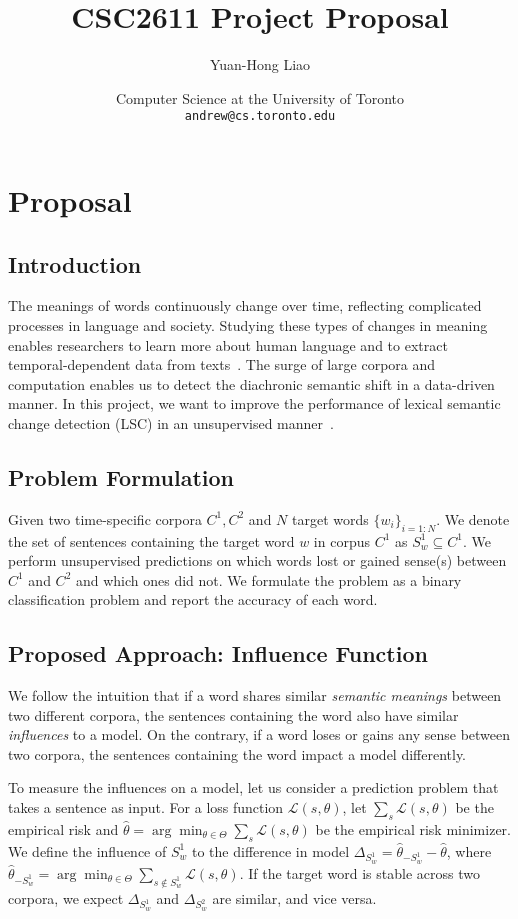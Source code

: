 \documentclass[a4paper]{article}
\title{CSC2611 Project Proposal}
\author{Yuan-Hong Liao}
\date{
	Computer Science at the University of Toronto \\ \texttt{andrew@cs.toronto.edu}
}
\theoremstyle{plain}
\theoremstyle{definition}
\begin{document}
\maketitle

\section{Proposal}

\subsection{Introduction}

The meanings of words continuously change over time, reflecting complicated processes in language and society. 
Studying these types of changes in meaning enables researchers to learn more about human language and to extract temporal-dependent data from texts~\cite{kutuzov-etal-2018-diachronic}.
The surge of large corpora and computation enables us to detect the diachronic semantic shift in a data-driven manner.
In this project, we want to improve the performance of lexical semantic change detection (LSC) in an unsupervised manner~\cite{schlechtweg-etal-2020-semeval}.


\subsection{Problem Formulation}
Given two time-specific corpora $C^1, C^2$ and $N$ target words $\{w_i\}_{i=1:N}$.
We denote the set of sentences containing the target word $w$ in corpus $C^1$ as $S_w^1 \subseteq C^1$.
We perform unsupervised predictions on which words lost or gained sense(s) between $C^1$ and $C^2$ and which ones did not.
We formulate the problem as a binary classification problem and report the accuracy of each word.


\subsection{Proposed Approach: Influence Function}

We follow the intuition that if a word shares similar \textit{semantic meanings} between two different corpora, the sentences containing the word also have similar \textit{influences} to a model.
On the contrary, if a word loses or gains any sense between two corpora, the sentences containing the word impact a model differently.

To measure the influences on a model, let us consider a prediction problem that takes a sentence as input.
For a loss function $\mathcal{L}(s, \theta)$, let $\sum_{s} \mathcal{L}(s, \theta)$ be the empirical risk and $\hat{\theta} = \arg\min_{\theta \in \Theta} \sum_{s} \mathcal{L}(s, \theta)$ be the empirical risk minimizer.
We define the influence of $S_w^1$ to the difference in model $\Delta_{S_w^1} = \hat{\theta}_{-S_w^1} - \hat{\theta}$, where $\hat{\theta}_{-S_w^1} = \arg\min_{\theta \in \Theta} \sum_{s \not\in S_w^1} \mathcal{L}(s, \theta)$.
If the target word is stable across two corpora, we expect $\Delta_{S_w^1}$ and $\Delta_{S_w^2}$ are similar, and vice versa.
\end{document}
